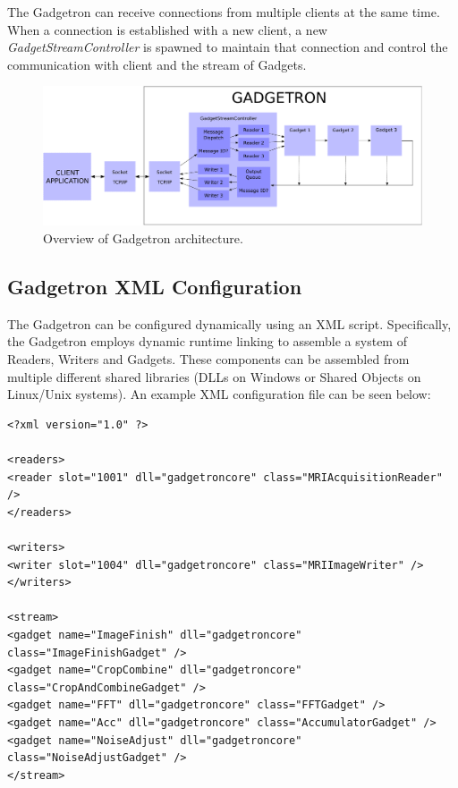 \documentclass[11pt]{article}
\begin{document}
The Gadgetron can receive connections from multiple clients at the same time. When a connection is established with a new client, a new \emph{GadgetStreamController} is spawned to maintain that connection and control the communication with client and the stream of Gadgets. 

\begin{figure}[htbp] %
   \centering
   \includegraphics[width=6in]{figures/architecture.eps} 
   \caption{Overview of Gadgetron architecture.}
   \label{fig:architecture}
\end{figure}

\subsection{Gadgetron XML Configuration}
\label{section:gadgetxmlconfiguration}
The Gadgetron can be configured dynamically using an XML script. Specifically, the Gadgetron employs dynamic runtime linking to assemble a system of Readers, Writers and Gadgets. These components can be assembled from multiple different shared libraries (DLLs on Windows or Shared Objects on Linux/Unix systems). An example XML configuration file can be seen below:

{\scriptsize 
\begin{verbatim}
<?xml version="1.0" ?>  

<readers>
<reader slot="1001" dll="gadgetroncore" class="MRIAcquisitionReader" />
</readers>

<writers>
<writer slot="1004" dll="gadgetroncore" class="MRIImageWriter" />
</writers>

<stream>
<gadget name="ImageFinish" dll="gadgetroncore" class="ImageFinishGadget" />
<gadget name="CropCombine" dll="gadgetroncore" class="CropAndCombineGadget" />
<gadget name="FFT" dll="gadgetroncore" class="FFTGadget" />
<gadget name="Acc" dll="gadgetroncore" class="AccumulatorGadget" /> 
<gadget name="NoiseAdjust" dll="gadgetroncore" class="NoiseAdjustGadget" />
</stream>
\end{verbatim} 
}
\end{document}
